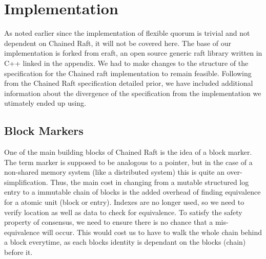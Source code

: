 \section{Implementation}
\label{sec:implementation}
As noted earlier since the implementation of flexible quorum is trivial and not dependent on Chained Raft, it will not be covered here. 
The base of our implementation is forked from eraft, an open source generic raft library written in C++ linked in the appendix. 
We had to make changes to the structure of the specification for the Chained raft implementation to remain feasible. 
Following from the Chained Raft specification detailed prior, we have included additional information about the divergence of the specification from the implementation we utimately ended up using.

\subsection{Block Markers}
One of the main building blocks of Chained Raft is the idea of a block marker. 
The term marker is supposed to be analogous to a pointer, but in the case of a non-shared memory system (like a distributed system) this is quite an over-simplification. 
Thus, the main cost in changing from a mutable structured log entry to a immutable chain of blocks is the added overhead of finding equivalence for a atomic unit (block or entry). 
Indexes are no longer used, so we need to verify location as well as data to check for equivalence.
To satisfy the safety property of consensus, we need to ensure there is no chance that a mis-equivalence will occur. 
This would cost us to have to walk the whole chain behind a block everytime, as each blocks identity is dependant on the blocks (chain) before it. 


